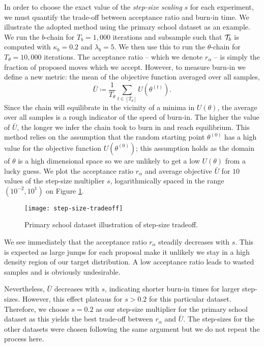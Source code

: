 In order to choose the exact value of the {\em step-size scaling} $s$ for each experiment, we must quantify the trade-off between acceptance ratio and burn-in time. We illustrate the adopted method using the primary school dataset \cite{schools} as an example. We run the $b$-chain for $T_b = 1,000$ iterations and subsample such that $\mathcal{T}_b$ is computed with $\kappa_b=0.2$ and $\lambda_b=5$. We then use this to run the $\theta$-chain for $T_\theta = 10,000$ iterations. The acceptance ratio -- which we denote $r_\alpha$ -- is simply the fraction of proposed moves which we accept. However, to measure burn-in we define a new metric: the mean of the objective function averaged over all samples,
%
\begin{equation}
	\bar{U} \coloneqq \frac{1}{T_\theta} \sum_{t \in [T_\theta]} U\left( \theta^{(t)} \right).
\end{equation}
%
Since the chain will equilibrate in the vicinity of a minima in $U(\theta)$, the average over all samples is a rough indicator of the speed of burn-in. The higher the value of $\bar{U}$, the longer we infer the chain took to burn in and reach equilibrium. This method relies on the assumption that the random starting point $\theta^{(0)}$ has a high value for the objective function $U(\theta^{(0)})$; this assumption holds as the domain of $\theta$ is a high dimensional space so we are unlikely to get a low $U(\theta)$ from a lucky guess. We plot the acceptance ratio $r_\alpha$ and average objective $\bar{U}$ for $10$ values of the step-size multiplier $s$, logarithmically spaced in the range $(10^{-2}, 10^1)$ on Figure \ref{fig:step-size-tradeoff}.
%
\begin{figure}[!h]
	\centering
	\texttt{[image: step-size-tradeoff]}
	\caption{Primary school dataset illustration of step-size tradeoff.}
	\label{fig:step-size-tradeoff}
\end{figure}

We see immediately that the acceptance ratio $r_\alpha$ steadily decreases with $s$. This is expected as large jumps for each proposal make it unlikely we stay in a high density region of our target distribution. A low acceptance ratio leads to wasted samples and is obviously undesirable.

Nevertheless, $\bar{U}$ decreases with $s$, indicating shorter burn-in times for larger step-sizes. However, this effect plateaus for $s>0.2$ for this particular dataset. Therefore, we choose $s=0.2$ as our step-size multiplier for the primary school dataset as this yields the best trade-off between $r_\alpha$ and $\bar{U}$. The step-sizes for the other datasets were chosen following the same argument but we do not repeat the process here.

